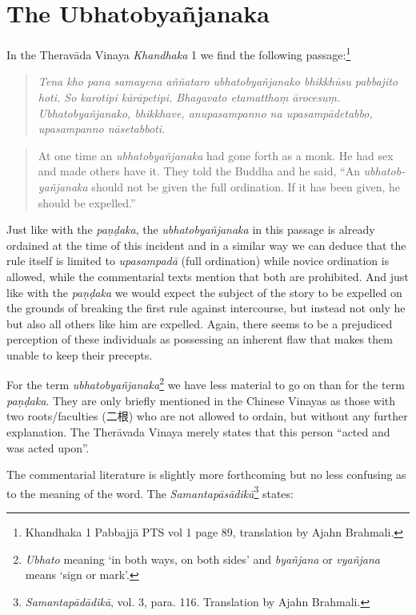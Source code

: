 \section{The Ubhatob­yañ­janaka}
In the Theravāda Vinaya {\em Khandhaka} 1 we find the following passage:\footnote{Khandhaka 1 Pabbajjā PTS vol 1 page 89, translation by Ajahn Brahmali.}

\begin{quote}
{\em Tena kho pana samayena aññataro ubhatobyañjanako bhikkhūsu pabbajito hoti. So karotipi kārāpetipi. Bhagavato etamatthaṃ ārocesuṃ. Ubhatobyañjanako, bhikkhave, anupasampanno na upasampādetabbo, upasampanno nāsetabboti.}
\end{quote}

\begin{quote}
At one time an {\em ubhatob­yañ­janaka} had gone forth as a monk. He had sex and made others have it. They told the Buddha and he said, “An {\em ubhatob­yañ­janaka} should not be given the full ordination. If it has been given, he should be expelled.”
\end{quote}

Just like with the {\em paṇḍaka}, the {\em ubhatob­yañ­janaka} in this passage is already ordained at the time of this incident and in a similar way we can deduce that the rule itself is limited to {\em upasampadā} (full ordination) while novice ordination is allowed, while the commentarial texts mention that both are prohibited. And just like with the {\em paṇḍaka} we would expect the subject of the story to be expelled on the grounds of breaking the first rule against intercourse, but instead not only he but also all others like him are expelled. Again, there seems to be a prejudiced perception of these individuals as possessing an inherent flaw that makes them unable to keep their precepts.

For the term {\em ubhatob­yañ­janaka}\footnote{{\em Ubhato} meaning `in both ways, on both sides' and {\em byañjana} or {\em vyañjana} means `sign or mark'.} we have less material to go on than for the term {\em paṇḍaka}. They are only briefly mentioned in the Chinese Vinayas as those with two roots/faculties (二根) who are not allowed to ordain, but without any further explanation. The Therāvada Vinaya merely states that this person ``acted and was acted upon''. 

The commentarial literature is slightly more forthcoming but no less confusing as to the meaning of the word. The {\em Samantapāsādikā}\footnote{{\em Samantapādādikā}, vol. 3, para. 116. Translation by Ajahn Brahmali.} states:

